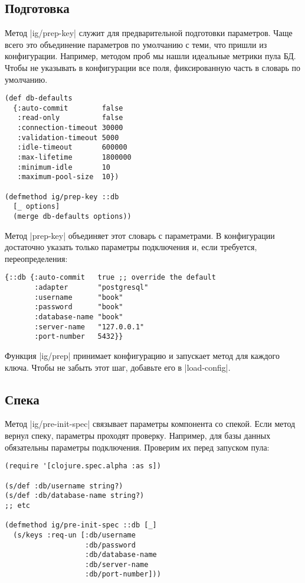 \subsection{Подготовка}

Метод \spverb|ig/prep-key| служит для предварительной подготовки
параметров. Чаще всего это объединение параметров по умолчанию с теми, что
пришли из конфигурации. Например, методом проб мы нашли идеальные метрики пула
БД. Чтобы не указывать в конфигурации все поля, фиксированную часть в словарь по
умолчанию.

\begin{verbatim}
(def db-defaults
  {:auto-commit        false
   :read-only          false
   :connection-timeout 30000
   :validation-timeout 5000
   :idle-timeout       600000
   :max-lifetime       1800000
   :minimum-idle       10
   :maximum-pool-size  10})

(defmethod ig/prep-key ::db
  [_ options]
  (merge db-defaults options))
\end{verbatim}

Метод \spverb|prep-key| объединяет этот словарь с параметрами. В конфигурации
достаточно указать только параметры подключения и, если требуется,
переопределения:

\begin{verbatim}
{::db {:auto-commit   true ;; override the default
       :adapter       "postgresql"
       :username      "book"
       :password      "book"
       :database-name "book"
       :server-name   "127.0.0.1"
       :port-number   5432}}
\end{verbatim}

Функция \spverb|ig/prep| принимает конфигурацию и запускает метод для каждого
ключа. Чтобы не забыть этот шаг, добавьте его в \spverb|load-config|.

\subsection{Спека}

Метод \spverb|ig/pre-init-spec| связывает параметры компонента со спекой. Если
метод вернул спеку, параметры проходят проверку. Например, для базы данных
обязательны параметры подключения. Проверим их перед запуском пула:

\begin{verbatim}
(require '[clojure.spec.alpha :as s])

(s/def :db/username string?)
(s/def :db/database-name string?)
;; etc

(defmethod ig/pre-init-spec ::db [_]
  (s/keys :req-un [:db/username
                   :db/password
                   :db/database-name
                   :db/server-name
                   :db/port-number]))
\end{verbatim}

